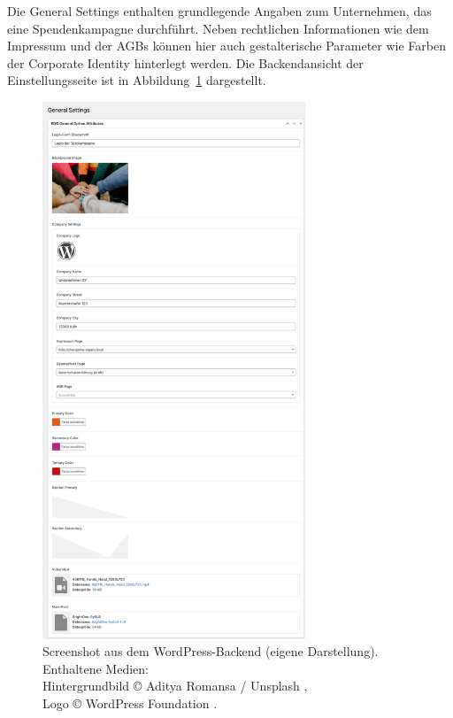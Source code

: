 Die General Settings enthalten grundlegende Angaben zum Unternehmen, das eine Spendenkampagne durchführt.
Neben rechtlichen Informationen wie dem Impressum und der AGBs können hier auch gestalterische Parameter wie Farben der Corporate Identity hinterlegt werden.
Die Backendansicht der Einstellungsseite ist in Abbildung~\ref{fig:charigame-general-settings-legacy} dargestellt.
\begin{figure}[H]
    \centering
    \includegraphics[width=0.7\textwidth]{images/legacy_general_settings}
    \caption{Screenshot aus dem WordPress-Backend (eigene Darstellung).\\
    Enthaltene Medien:\\Hintergrundbild © Aditya Romansa / Unsplash \cite{unsplash_romansa_babyhand},\\
    Logo © WordPress Foundation \cite{wordpresslogo}.}
    \label{fig:charigame-general-settings-legacy}
\end{figure}

